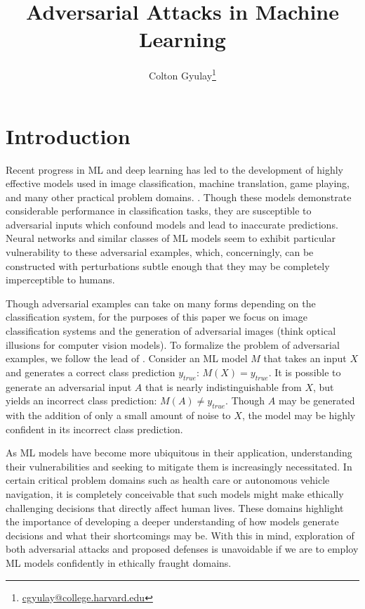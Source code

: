 \documentclass[]{article}
\title{Adversarial Attacks in Machine Learning}
\author{
Colton Gyulay\thanks{\href{mailto:cgyulay@college.harvard.edu}{cgyulay@college.harvard.edu}}
}
\date{} %
\begin{document}
\maketitle %


\section*{Introduction}

Recent progress in ML and deep learning has led to the development of highly effective models used in image classification, machine translation, game playing, and many other practical problem domains.
\citep{NIPS2012_4824, DBLP:journals/corr/BahdanauCB14, mnih2015human}. Though these models demonstrate considerable performance in classification tasks, they are susceptible to adversarial inputs which confound models and lead to inaccurate predictions. Neural networks and similar classes of ML models seem to exhibit particular vulnerability to these adversarial examples, which, concerningly, can be constructed with perturbations subtle enough that they may be completely imperceptible to humans.

Though adversarial examples can take on many forms depending on the classification system, for the purposes of this paper we focus on image classification systems and the generation of adversarial images (think optical illusions for computer vision models). To formalize the problem of adversarial examples, we follow the lead of \citet{DBLP:journals/corr/KurakinGB16}. Consider an ML model $M$ that takes an input $X$ and generates a correct class prediction $y_{true}$: $M(X)=y_{true}$. It is possible to generate an adversarial input $A$ that is nearly indistinguishable from $X$, but yields an incorrect class prediction: $M(A)\neq y_{true}$. Though $A$ may be generated with the addition of only a small amount of noise to $X$, the model may be highly confident in its incorrect class prediction.

As ML models have become more ubiquitous in their application, understanding their vulnerabilities and seeking to mitigate them is increasingly necessitated. In certain critical problem domains such as health care or autonomous vehicle navigation, it is completely conceivable that such models might make ethically challenging decisions that directly affect human lives. These domains highlight the importance of developing a deeper understanding of how models generate decisions and what their shortcomings may be. With this in mind, exploration of both adversarial attacks and proposed defenses is unavoidable if we are to employ ML models confidently in ethically fraught domains.
\end{document}
